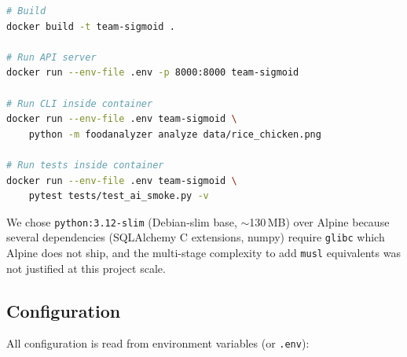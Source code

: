 \documentclass[11pt,a4paper]{article}
\begin{document}
\begin{lstlisting}[style=python,language=bash,numbers=none]
# Build
docker build -t team-sigmoid .

# Run API server
docker run --env-file .env -p 8000:8000 team-sigmoid

# Run CLI inside container
docker run --env-file .env team-sigmoid \
    python -m foodanalyzer analyze data/rice_chicken.png

# Run tests inside container
docker run --env-file .env team-sigmoid \
    pytest tests/test_ai_smoke.py -v
\end{lstlisting}

We chose \texttt{python:3.12-slim} (Debian-slim base, $\sim$130\,MB) over Alpine because several dependencies (SQLAlchemy C extensions, numpy) require \texttt{glibc} which Alpine does not ship, and the multi-stage complexity to add \texttt{musl} equivalents was not justified at this project scale.

\usepackage{tabularx} %
\usepackage{booktabs}


\subsection{Configuration}

All configuration is read from environment variables (or \texttt{.env}):
\end{document}
